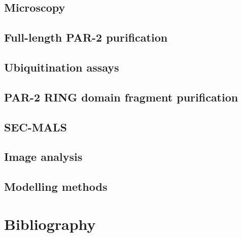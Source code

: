 \documentclass[12pt]{"article"}
\begin{document}
\subsection{Microscopy}
\subsection{Full-length PAR-2 purification}
\subsection{Ubiquitination assays}
\subsection{PAR-2 RING domain fragment purification}
\subsection{SEC-MALS}
\subsection{Image analysis}
\subsection{Modelling methods}

\clearpage
\section{Bibliography}
\end{document}
